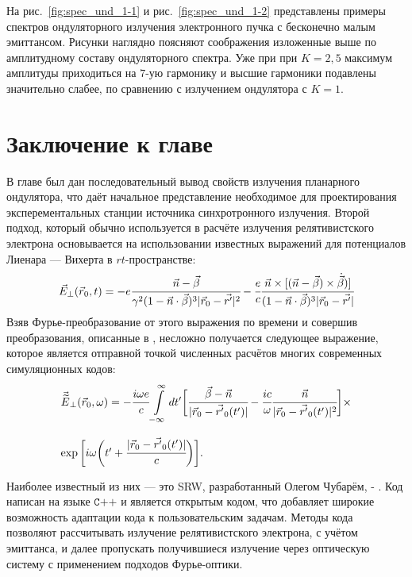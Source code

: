 На рис.~\ref{fig:spec_und_1-1} и рис.~\ref{fig:spec_und_1-2} представлены примеры спектров ондуляторного излучения электронного пучка с бесконечно малым эмиттансом. Рисунки наглядно поясняют соображения изложенные выше по амплитудному составу ондуляторного спектра. Уже при при $K = 2,5$ максимум амплитуды приходиться на $7$-ую гармонику и высшие гармоники подавлены значительно слабее, по сравнению с излучением ондулятора с $K = 1$.

\section{Заключение к главе}
В главе был дан последовательный вывод свойств излучения планарного ондулятора, что даёт начальное представление необходимое для проектирования эксперементальных станции источника синхротронного излучения. Второй подход, который обычно используется в расчёте излучения релятивистского электрона основывается на использовании известных выражений для потенциалов Лиенара — Вихерта в $rt$-пространстве:
\begin{equation}
	\label{eq:Lienard_Wiechert}
	\vec{{E}}_{\bot}(\vec{r}{_0}, t) = -e \cfrac{\vec{n} - \vec{\beta}}{\gamma^2 (1 - \vec{n}\cdot\vec{\beta})^3 |\vec{r}_{ 0} - \vec{r'}|^2} - \cfrac{e}{c}\cfrac{\vec{n}\times[(\vec{n} - \vec{\beta})\times\dot{\vec{\beta}})]}{(1 - \vec{n}\cdot\vec{\beta})^3 |\vec{r}_{ 0} - \vec{r'}|}
\end{equation}
Взяв Фурье-преобразование от этого выражения по времени и совершив преобразования, описанные в \cite{geloni2006fourier}, несложно получается следующее выражение, которое является отправной точкой численных расчётов многих современных симуляционных кодов:
\begin{equation}
	\label{eq:field_dist_in_integral}
	\begin{array}{lcl}
	\vec{\widetilde{E}}_{\bot}(\vec{r}_0, \omega) = 
	-\cfrac{i\omega e}{c}\displaystyle\int\limits_{-\infty}^{\infty} dt'\bigg[\cfrac{\vec{\beta} - \vec{n}}{|\vec{r}_0 - \vec{r'}_0(t')|} - \cfrac{ic}{\omega}\cfrac{\vec{n}}{|\vec{r}_0 - \vec{r'}_0(t')|^2}\bigg]\times\\
	\\
	\exp\bigg[i\omega\bigg(t' + \cfrac{|\vec{r}_0 - \vec{r'}_0(t')|}{c}\bigg)\bigg].
	\end{array}
\end{equation}

Наиболее известный из них --- это SRW, разработанный Олегом Чубарём, \cite{chubar1998proceedings} - \cite{chubar1998accurate}. Код написан на языке $\texttt{C++}$ и является открытым кодом, что добавляет широкие возможность адаптации кода к пользовательским задачам. Методы кода позволяют рассчитывать излучение релятивистского электрона, с учётом эмиттанса, и далее пропускать получившиеся излучение через оптическую систему с применением подходов Фурье-оптики.

